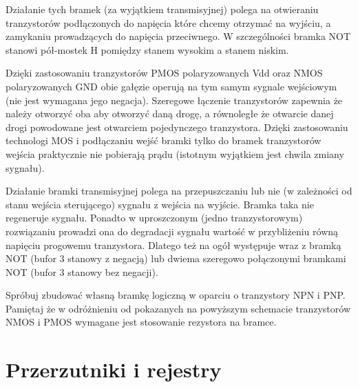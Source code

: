 \documentclass{pdfBooklets}
\begin{document}
Działanie tych bramek (za wyjątkiem transmisyjnej) polega na otwieraniu tranzystorów podłączonych do napięcia które chcemy otrzymać na wyjściu, a zamykaniu prowadzących do napięcia przeciwnego. W szczególności bramka NOT stanowi pół-mostek H pomiędzy stanem wysokim a stanem niskim.

Dzięki zastosowaniu tranzystorów PMOS polaryzowanych Vdd oraz NMOS polaryzowanych GND obie gałęzie operują na tym samym sygnale wejściowym (nie jest wymagana jego negacja). Szeregowe łączenie tranzystorów zapewnia że należy otworzyć oba aby otworzyć daną drogę, a równoległe że otwarcie danej drogi powodowane jest otwarciem pojedynczego tranzystora. Dzięki zastosowaniu technologi MOS i podłączaniu wejść bramki tylko do bramek tranzystorów wejścia praktycznie nie pobierają prądu (istotnym wyjątkiem jest chwila zmiany sygnału).

Działanie bramki transmisyjnej polega na przepuszczaniu lub nie (w zależności od stanu wejścia sterującego) sygnału z wejścia na wyjście. Bramka taka nie regeneruje sygnału. Ponadto w uproszczonym (jedno tranzystorowym) rozwiązaniu prowadzi ona do degradacji sygnału wartość w przybliżeniu równą napięciu progowemu tranzystora. Dlatego też na ogół występuje wraz z bramką NOT (bufor 3 stanowy z negacją) lub dwiema szeregowo połączonymi bramkami NOT (bufor 3 stanowy bez negacji).

\begin{Zadanie}{}{}
Spróbuj zbudować własną bramkę logiczną w oparciu o tranzystory NPN i PNP. Pamiętaj że w odróżnieniu od pokazanych na powyższym schemacie tranzystorów NMOS i PMOS wymagane jest stosowanie rezystora na bramce.
\end{Zadanie}

\section{Przerzutniki i rejestry}
\end{document}
